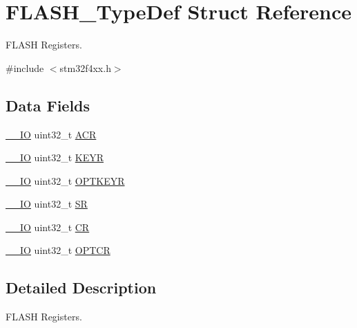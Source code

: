 \hypertarget{struct_f_l_a_s_h___type_def}{\section{F\-L\-A\-S\-H\-\_\-\-Type\-Def Struct Reference}
\label{struct_f_l_a_s_h___type_def}
}


F\-L\-A\-S\-H Registers.  




{\ttfamily \#include $<$stm32f4xx.\-h$>$}

\subsection*{Data Fields}
\begin{DoxyCompactItemize}
\item 
\hyperlink{group___c_m_s_i_s__core__definitions_gaec43007d9998a0a0e01faede4133d6be}{\-\_\-\-\_\-\-I\-O} uint32\-\_\-t \hyperlink{struct_f_l_a_s_h___type_def_a9cb55206b29a8c16354747c556ab8bea}{A\-C\-R}
\item 
\hyperlink{group___c_m_s_i_s__core__definitions_gaec43007d9998a0a0e01faede4133d6be}{\-\_\-\-\_\-\-I\-O} uint32\-\_\-t \hyperlink{struct_f_l_a_s_h___type_def_a84c491be6c66b1d5b6a2efd0740b3d0c}{K\-E\-Y\-R}
\item 
\hyperlink{group___c_m_s_i_s__core__definitions_gaec43007d9998a0a0e01faede4133d6be}{\-\_\-\-\_\-\-I\-O} uint32\-\_\-t \hyperlink{struct_f_l_a_s_h___type_def_afc4900646681dfe1ca43133d376c4423}{O\-P\-T\-K\-E\-Y\-R}
\item 
\hyperlink{group___c_m_s_i_s__core__definitions_gaec43007d9998a0a0e01faede4133d6be}{\-\_\-\-\_\-\-I\-O} uint32\-\_\-t \hyperlink{struct_f_l_a_s_h___type_def_af6aca2bbd40c0fb6df7c3aebe224a360}{S\-R}
\item 
\hyperlink{group___c_m_s_i_s__core__definitions_gaec43007d9998a0a0e01faede4133d6be}{\-\_\-\-\_\-\-I\-O} uint32\-\_\-t \hyperlink{struct_f_l_a_s_h___type_def_ab40c89c59391aaa9d9a8ec011dd0907a}{C\-R}
\item 
\hyperlink{group___c_m_s_i_s__core__definitions_gaec43007d9998a0a0e01faede4133d6be}{\-\_\-\-\_\-\-I\-O} uint32\-\_\-t \hyperlink{struct_f_l_a_s_h___type_def_acfef9b6d7da4271943edc04d7dfdf595}{O\-P\-T\-C\-R}
\end{DoxyCompactItemize}


\subsection{Detailed Description}
F\-L\-A\-S\-H Registers. 

